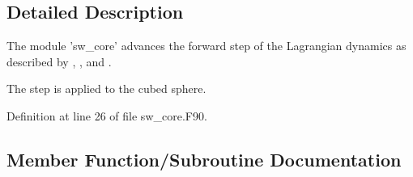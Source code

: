 \subsection{Detailed Description}
The module 'sw\-\_\-core' advances the forward step of the Lagrangian dynamics as described by \cite{lin1997explicit}, \cite{lin2004vertically}, and \cite{harris2013two}. 

The step is applied to the cubed sphere. 

Definition at line 26 of file sw\-\_\-core.\-F90.



\subsection{Member Function/\-Subroutine Documentation}
